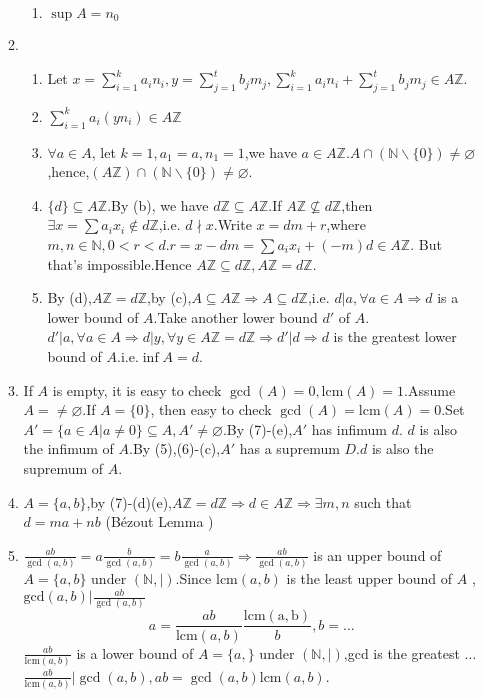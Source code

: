 \documentclass[12pt]{article}
\newcommand{\NN}{\mathbb{N}}
\newcommand{\ZZ}{\mathbb{Z}}
\begin{document}
\begin{enumerate}
\begin{enumerate}
\begin{enumerate}
                    \item $\sup A=n_0$
                \end{enumerate}
            \item 
                \begin{enumerate}
                    \item Let $x=\sum_{i=1}^{k}a_in_i,y=\sum_{j=1}^{t}b_jm_j,\sum_{i=1}^{k}a_in_i+\sum_{j=1}^{t}b_jm_j\in A\mathbb{Z}$.
                    \item $\sum_{i=1}^{k}a_i (yn_i)\in A\mathbb{Z}$
                    \item $\forall a\in A$, let $k=1,a_1=a,n_1=1$,we have $a\in A\mathbb{Z}$.$A\cap (\mathbb{N}\backslash\{0\})\not=\varnothing$,hence,$(A\mathbb{Z})\cap(\mathbb{N}\backslash\{0\})\not=\varnothing$.
                    \item $\{d\}\subseteq A\ZZ$.By (b), we have $d\ZZ\subseteq A\ZZ$.If $A\ZZ\nsubseteq d\ZZ$,then $\exists x=\sum a_ix_i\notin d\ZZ$,i.e. $d\nmid x$.Write $x=dm+r$,where $m,n\in \NN,0<r<d$.$r=x-dm=\sum a_ix_i+(-m)d\in A\ZZ$. But that's impossible.Hence $A\ZZ\subseteq d\ZZ,A\ZZ=d\ZZ$.
                    \item By (d),$A\ZZ= d\ZZ$,by (c),$A\subseteq A\ZZ\Rightarrow A\subseteq d\ZZ$,i.e. $d|a,\forall a\in A\Rightarrow d$ is a lower bound of $A$.Take another lower bound $d'$ of $A$.$d'|a,\forall a \in A\Rightarrow d|y,\forall y\in A\ZZ=d\ZZ\Rightarrow d'|d\Rightarrow d$ is the greatest lower bound of $A$.i.e.$\inf A=d$.        
                \end{enumerate}
            \item If $A$ is empty, it is easy to check $\gcd(A)=0,\mathrm{lcm}(A)=1$.Assume $A=\not=\varnothing$.If $A=\{0\}$, then easy to check $\gcd(A)=\mathrm{lcm}(A)=0$.Set $A'=\{a\in A|a\not=0\}\subseteq A,A'\not=\varnothing$.By (7)-(e),$A'$ has infimum $d$. $d$ is also the infimum of $A$.By (5),(6)-(c),$A'$ has a supremum $D$.$d$ is also the supremum of $A$.
            \item $A=\{a,b\}$,by (7)-(d)(e),$A\ZZ=d\ZZ\Rightarrow d\in A\ZZ\Rightarrow\exists m,n$ such that $d=ma+nb$ (Bézout Lemma )
            \item $\frac{ab}{\gcd(a,b)}=a\frac{b}{\gcd(a,b)}=b\frac{a}{\gcd(a,b)}\Rightarrow \frac{ab}{\gcd(a,b)}$ is an upper bound of $A=\{a,b\}$ under $(\NN,|)$.Since $\mathrm{lcm}(a,b)$ is the least upper bound of $A$ , $\mathrm{gcd}(a,b)|\frac{ab}{\gcd(a,b)}$$$a=\frac{ab}{\mathrm{lcm}(a,b)}\frac{\mathrm{lcm(a,b)}}{b},b=\dots$$ $ \frac{ab}{\mathrm{lcm}(a,b)}$ is a lower bound of $A=\{a,\}$ under $(\NN,|)$,gcd is the greatest $\dots$\newline
                $ \frac{ab}{\mathrm{lcm}(a,b)}|\gcd(a,b),ab=\gcd(a,b)\mathrm{lcm}(a,b)$.
        \end{enumerate}
        

\end{enumerate}
\end{document}
